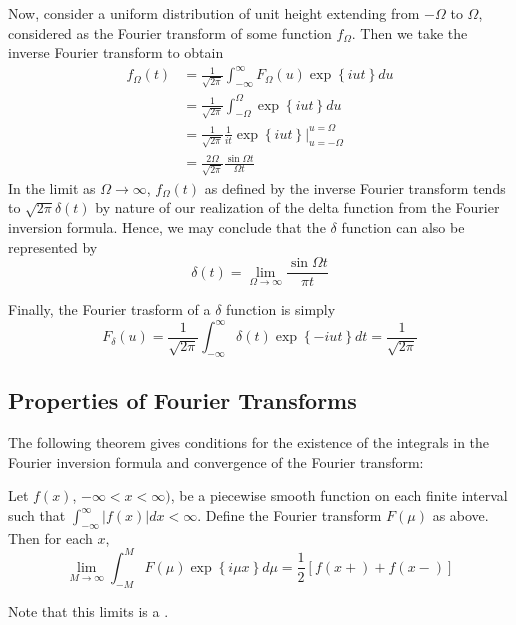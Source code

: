\documentclass[12pt, a4paper, oneside, openright, titlepage]{book}
\begin{document}
Now, consider a uniform distribution of unit height extending from $-\Omega$ to $\Omega$, considered as the Fourier transform of some function $f_{\Omega}$. Then we take the inverse Fourier transform to obtain \begin{align*}
    f_{\Omega}(t) &= \frac{1}{\sqrt{2\pi}}\int_{-\infty}^{\infty}F_{\Omega}(u)\exp\left\{iut\right\}du \\
    &= \frac{1}{\sqrt{2\pi}}\int_{-\Omega}^{\Omega}\exp\left\{iut\right\}du \\
    &= \frac{1}{\sqrt{2\pi}}\frac{1}{it}\exp\left\{iut\right\}\Bigg\rvert_{u=-\Omega}^{u=\Omega} \\
    &= \frac{2\Omega}{\sqrt{2\pi}}\frac{\sin\Omega t}{\Omega t}
\end{align*}
In the limit as $\Omega\rightarrow \infty$, $f_{\Omega}(t)$ as defined by the inverse Fourier transform tends to $\sqrt{2\pi}\delta(t)$ by nature of our realization of the delta function from the Fourier inversion formula. Hence, we may conclude that the $\delta$ function can also be represented by \begin{equation*}
    \delta(t) = \lim\limits_{\Omega\rightarrow \infty}\frac{\sin\Omega t}{\pi t}
\end{equation*}

Finally, the Fourier trasform of a $\delta$ function is simply \begin{equation*}
    F_{\delta}(u) = \frac{1}{\sqrt{2\pi}}\int_{-\infty}^{\infty}\delta(t)\exp\left\{-iut\right\}dt = \frac{1}{\sqrt{2\pi}}
\end{equation*}


\subsection{Properties of Fourier Transforms}

The following theorem gives conditions for the existence of the integrals in the Fourier inversion formula and convergence of the Fourier transform: 

\begin{thm}
    Let $f(x)$, $-\infty < x < \infty)$, be a piecewise smooth function on each finite interval such that $\int_{-\infty}^{\infty}|f(x)|dx < \infty$. Define the Fourier transform $F(\mu)$ as above. Then for each $x$, \begin{equation*}
        \lim\limits_{M\rightarrow \infty}\int_{-M}^MF(\mu)\exp\left\{i\mu x\right\}d\mu = \frac{1}{2}[f(x+)+f(x-)]
    \end{equation*}
\end{thm}
Note that this limits is a .
\end{document}
